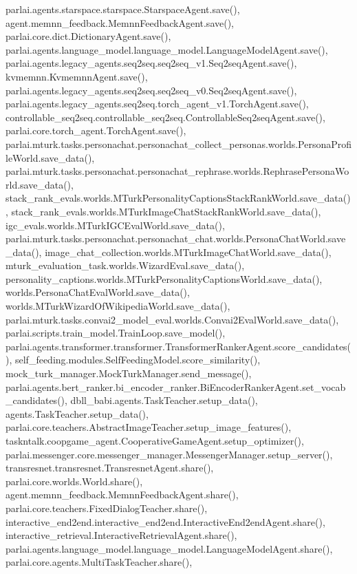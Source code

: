 parlai.\+agents.\+starspace.\+starspace.\+Starspace\+Agent.\+save(), agent.\+memnn\+\_\+feedback.\+Memnn\+Feedback\+Agent.\+save(), parlai.\+core.\+dict.\+Dictionary\+Agent.\+save(), parlai.\+agents.\+language\+\_\+model.\+language\+\_\+model.\+Language\+Model\+Agent.\+save(), parlai.\+agents.\+legacy\+\_\+agents.\+seq2seq.\+seq2seq\+\_\+v1.\+Seq2seq\+Agent.\+save(), kvmemnn.\+Kvmemnn\+Agent.\+save(), parlai.\+agents.\+legacy\+\_\+agents.\+seq2seq.\+seq2seq\+\_\+v0.\+Seq2seq\+Agent.\+save(), parlai.\+agents.\+legacy\+\_\+agents.\+seq2seq.\+torch\+\_\+agent\+\_\+v1.\+Torch\+Agent.\+save(), controllable\+\_\+seq2seq.\+controllable\+\_\+seq2seq.\+Controllable\+Seq2seq\+Agent.\+save(), parlai.\+core.\+torch\+\_\+agent.\+Torch\+Agent.\+save(), parlai.\+mturk.\+tasks.\+personachat.\+personachat\+\_\+collect\+\_\+personas.\+worlds.\+Persona\+Profile\+World.\+save\+\_\+data(), parlai.\+mturk.\+tasks.\+personachat.\+personachat\+\_\+rephrase.\+worlds.\+Rephrase\+Persona\+World.\+save\+\_\+data(), stack\+\_\+rank\+\_\+evals.\+worlds.\+M\+Turk\+Personality\+Captions\+Stack\+Rank\+World.\+save\+\_\+data(), stack\+\_\+rank\+\_\+evals.\+worlds.\+M\+Turk\+Image\+Chat\+Stack\+Rank\+World.\+save\+\_\+data(), igc\+\_\+evals.\+worlds.\+M\+Turk\+I\+G\+C\+Eval\+World.\+save\+\_\+data(), parlai.\+mturk.\+tasks.\+personachat.\+personachat\+\_\+chat.\+worlds.\+Persona\+Chat\+World.\+save\+\_\+data(), image\+\_\+chat\+\_\+collection.\+worlds.\+M\+Turk\+Image\+Chat\+World.\+save\+\_\+data(), mturk\+\_\+evaluation\+\_\+task.\+worlds.\+Wizard\+Eval.\+save\+\_\+data(), personality\+\_\+captions.\+worlds.\+M\+Turk\+Personality\+Captions\+World.\+save\+\_\+data(), worlds.\+Persona\+Chat\+Eval\+World.\+save\+\_\+data(), worlds.\+M\+Turk\+Wizard\+Of\+Wikipedia\+World.\+save\+\_\+data(), parlai.\+mturk.\+tasks.\+convai2\+\_\+model\+\_\+eval.\+worlds.\+Convai2\+Eval\+World.\+save\+\_\+data(), parlai.\+scripts.\+train\+\_\+model.\+Train\+Loop.\+save\+\_\+model(), parlai.\+agents.\+transformer.\+transformer.\+Transformer\+Ranker\+Agent.\+score\+\_\+candidates(), self\+\_\+feeding.\+modules.\+Self\+Feeding\+Model.\+score\+\_\+similarity(), mock\+\_\+turk\+\_\+manager.\+Mock\+Turk\+Manager.\+send\+\_\+message(), parlai.\+agents.\+bert\+\_\+ranker.\+bi\+\_\+encoder\+\_\+ranker.\+Bi\+Encoder\+Ranker\+Agent.\+set\+\_\+vocab\+\_\+candidates(), dbll\+\_\+babi.\+agents.\+Task\+Teacher.\+setup\+\_\+data(), agents.\+Task\+Teacher.\+setup\+\_\+data(), parlai.\+core.\+teachers.\+Abstract\+Image\+Teacher.\+setup\+\_\+image\+\_\+features(), taskntalk.\+coopgame\+\_\+agent.\+Cooperative\+Game\+Agent.\+setup\+\_\+optimizer(), parlai.\+messenger.\+core.\+messenger\+\_\+manager.\+Messenger\+Manager.\+setup\+\_\+server(), transresnet.\+transresnet.\+Transresnet\+Agent.\+share(), parlai.\+core.\+worlds.\+World.\+share(), agent.\+memnn\+\_\+feedback.\+Memnn\+Feedback\+Agent.\+share(), parlai.\+core.\+teachers.\+Fixed\+Dialog\+Teacher.\+share(), interactive\+\_\+end2end.\+interactive\+\_\+end2end.\+Interactive\+End2end\+Agent.\+share(), interactive\+\_\+retrieval.\+Interactive\+Retrieval\+Agent.\+share(), parlai.\+agents.\+language\+\_\+model.\+language\+\_\+model.\+Language\+Model\+Agent.\+share(), parlai.\+core.\+agents.\+Multi\+Task\+Teacher.\+share(), 